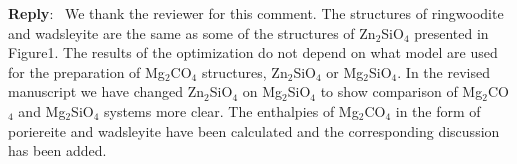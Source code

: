 \documentclass[a4paper]{article}
\newcounter{reviewer}
\newenvironment{reply}
   {\medskip \noindent \begin{sf}\textbf{Reply}:\  }
   {\medskip \end{sf}}
\begin{document}
\begin{reply}
We thank the reviewer for this comment. 
The structures of ringwoodite and wadsleyite are the same as some of the structures of Zn$_2$SiO$_4$ presented in Figure1. 
The results of the optimization do not depend on what model are used for the preparation of Mg$_2$CO$_4$ structures, Zn$_2$SiO$_4$ or Mg$_2$SiO$_4$. 
In the revised manuscript we have changed Zn$_2$SiO$_4$ on Mg$_2$SiO$_4$ to show comparison of Mg$_2$CO$_4$ and Mg$_2$SiO$_4$ systems more clear.
The enthalpies of Mg$_2$CO$_4$ in the form of poriereite and wadsleyite have been calculated and the corresponding discussion has been added.
\end{reply}
\end{document}
